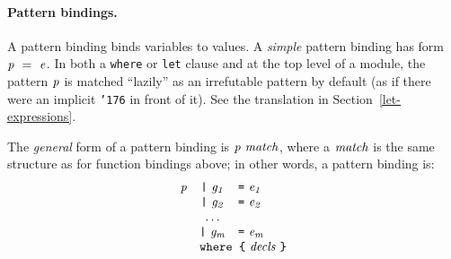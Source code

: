 \paragraph*{Pattern bindings.}
A pattern binding binds variables to values.  A {\em simple} pattern
binding has form \mbox{$\it p\ =\ e$}.
In both a \mbox{\tt where} or \mbox{\tt let} clause
and at the top level of a module, the pattern \mbox{$\it p$} is
matched ``lazily'' as an irrefutable pattern
by default (as if there
were an implicit \mbox{\tt {\char'176}} in front of it).  See the translation in
Section~\ref{let-expressions}.

The {\em general} form of a pattern binding is \mbox{$\it p\ match$}, where a
\mbox{$\it match$} is the same structure as for function bindings above; in other
words, a pattern binding is:
\[\ba{rcl}
\mbox{$\it p$} & \mbox{$\it \makebox{\tt |}\ g_{1}$}   & \mbox{$\it \makebox{\tt =}\ e_{1}$} \\
    & \mbox{$\it \makebox{\tt |}\ g_{2}$}   & \mbox{$\it \makebox{\tt =}\ e_{2}$} \\
    & \mbox{$\it \ldots $} \\
    & \mbox{$\it \makebox{\tt |}\ g_{m}$}   & \mbox{$\it \makebox{\tt =}\ e_{m}$} \\
    & \multicolumn{2}{l}{\mbox{$\it \makebox{\tt where\ {\char'173}}\ decls\ \makebox{\tt {\char'175}}$}}
\ea\]



